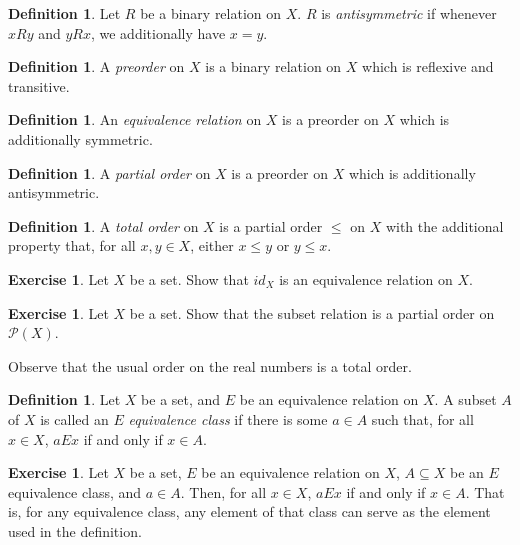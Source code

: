 \documentclass[letterpaper]{article}
\theoremstyle{definition}
\newtheorem{definition}[theorem]{Definition}
\newtheorem{exercise}[theorem]{Exercise}
\newcommand{\defterm}{\emph}
\renewcommand{\subset}{\subseteq}
\newcommand{\powerset}{\mathcal{P}}
\begin{document}
\begin{definition}
  Let \(R\) be a binary relation on \(X\).  \(R\) is
  \defterm{antisymmetric} if whenever \(xRy\) and \(yRx\), we
  additionally have \(x = y\).
\end{definition}

\begin{definition}
  A \defterm{preorder} on \(X\) is a binary relation on \(X\) which is
  reflexive and transitive.
\end{definition}

\begin{definition}
  An \defterm{equivalence relation} on \(X\) is a preorder on \(X\)
  which is additionally symmetric.
\end{definition}

\begin{definition}
  A \defterm{partial order} on \(X\) is a preorder on \(X\) which is
  additionally antisymmetric.
\end{definition}

\begin{definition}
  A \defterm{total order} on \(X\) is a partial order \(\leq\) on
  \(X\) with the additional property that, for all \(x,y \in X\),
  either \(x \leq y\) or \(y \leq x\).
\end{definition}

\begin{exercise}
  Let \(X\) be a set.  Show that \(id_X\) is an equivalence relation
  on \(X\).
\end{exercise}

\begin{exercise}
  Let \(X\) be a set.  Show that the subset relation is a partial
  order on \(\powerset(X)\).
\end{exercise}

Observe that the usual order on the real numbers is a total order.

\begin{definition}
  Let \(X\) be a set, and \(E\) be an equivalence relation on \(X\).
  A subset \(A\) of \(X\) is called an \(E\) \defterm{equivalence
    class} if there is some \(a \in A\) such that, for all \(x \in
  X\), \(aEx\) if and only if \(x \in A\).
\end{definition}

\begin{exercise}
  Let \(X\) be a set, \(E\) be an equivalence relation on \(X\), \(A
  \subset X\) be an \(E\) equivalence class, and \(a \in A\).  Then,
  for all \(x \in X\), \(aEx\) if and only if \(x \in A\).  That is,
  for any equivalence class, any element of that class can serve as
  the element used in the definition.
\end{exercise}
\end{document}
